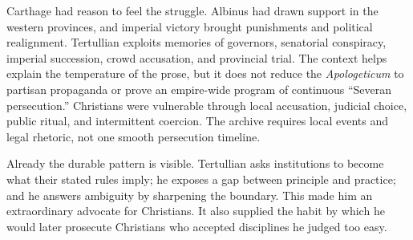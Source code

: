 Carthage had reason to feel the struggle. Albinus had drawn support in the
western provinces, and imperial victory brought punishments and political
realignment. Tertullian exploits memories of governors, senatorial conspiracy,
imperial succession, crowd accusation, and provincial trial. The context helps
explain the temperature of the prose, but it does not reduce the
\emph{Apologeticum} to partisan propaganda or prove an empire-wide program of
continuous ``Severan persecution.'' Christians were vulnerable through local
accusation, judicial choice, public ritual, and intermittent coercion. The
archive requires local events and legal rhetoric, not one smooth persecution
timeline.

Already the durable pattern is visible. Tertullian asks institutions to become
what their stated rules imply; he exposes a gap between principle and practice;
and he answers ambiguity by sharpening the boundary. This made him an
extraordinary advocate for Christians. It also supplied the habit by which he
would later prosecute Christians who accepted disciplines he judged too easy.
